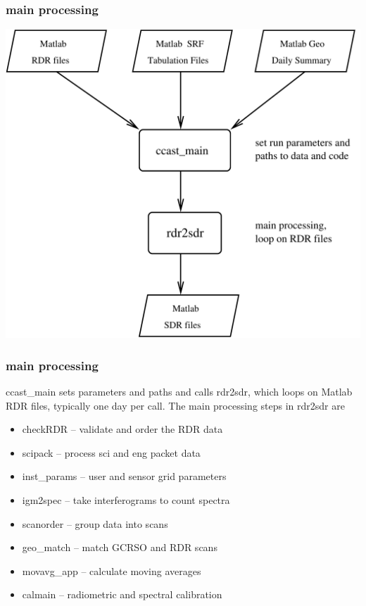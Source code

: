 \documentclass[11pt]{beamer}
\begin{document}
\begin{frame}
\frametitle{main processing}

\begin{center}
  \includegraphics[scale=0.4]{figures/mainpro.pdf}
\end{center}

\end{frame}
\begin{frame}
\frametitle{main processing}

ccast\_main sets parameters and paths and calls rdr2sdr, which 
loops on Matlab RDR files, typically one day per call.  The main
processing steps in rdr2sdr are

\begin{itemize}
  \item checkRDR -- validate and order the RDR data
  \item scipack  -- process sci and eng packet data
  \item inst\_params -- user and sensor grid parameters
  \item igm2spec -- take interferograms to count spectra
  \item scanorder -- group data into scans
  \item geo\_match  -- match GCRSO and RDR scans
  \item movavg\_app -- calculate moving averages
  \item calmain  -- radiometric and spectral calibration
\end{itemize}

\end{frame}
\end{document}

